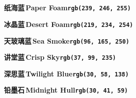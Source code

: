 
\cleardoublepage
\thispagestyle{empty}
\chapter*{\OUCPaletteName}
\noindent\colorbox{oucpal1}{\parbox[c][1cm][c]{\dimexpr\linewidth-2\fboxsep\relax}{\centering\bfseries\color{black}纸海蓝\,Paper Foam\quad\textnormal{\texttt{rgb(239, 246, 255)}}}}\par
\vspace{1.6cm}
\noindent\colorbox{oucpal2}{\parbox[c][1cm][c]{\dimexpr\linewidth-2\fboxsep\relax}{\centering\bfseries\color{black}冰晶蓝\,Desert Foam\quad\textnormal{\texttt{rgb(219, 234, 254)}}}}\par
\vspace{1.6cm}
\noindent\colorbox{oucpal3}{\parbox[c][1cm][c]{\dimexpr\linewidth-2\fboxsep\relax}{\centering\bfseries\color{black}天玻璃蓝\,Sea Smoke\quad\textnormal{\texttt{rgb(96, 165, 250)}}}}\par
\vspace{1.6cm}
\noindent\colorbox{oucpal4}{\parbox[c][1cm][c]{\dimexpr\linewidth-2\fboxsep\relax}{\centering\bfseries\color{white}讲堂蓝\,Crisp Sky\quad\textnormal{\texttt{rgb(37, 99, 235)}}}}\par
\vspace{1.6cm}
\noindent\colorbox{oucpal5}{\parbox[c][1cm][c]{\dimexpr\linewidth-2\fboxsep\relax}{\centering\bfseries\color{white}深思蓝\,Twilight Blue\quad\textnormal{\texttt{rgb(30, 58, 138)}}}}\par
\vspace{1.6cm}
\noindent\colorbox{oucpal6}{\parbox[c][1cm][c]{\dimexpr\linewidth-2\fboxsep\relax}{\centering\bfseries\color{white}铅墨石\,Midnight Hull\quad\textnormal{\texttt{rgb(30, 41, 59)}}}}\par
